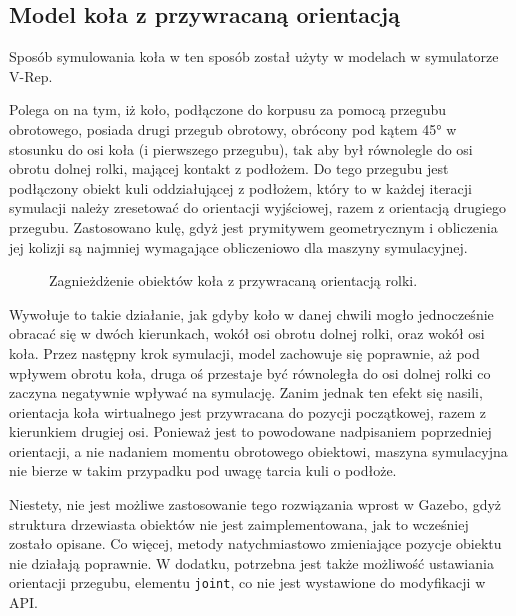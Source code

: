 	\subsection{Model koła z przywracaną orientacją}
		Sposób symulowania koła w ten sposób został użyty w modelach w symulatorze V-Rep.

		Polega on na tym, iż koło, podłączone do korpusu za pomocą przegubu obrotowego, posiada drugi przegub obrotowy, 
		obrócony pod kątem 45° w stosunku do osi koła (i pierwszego przegubu), tak aby był równolegle do osi obrotu dolnej rolki, mającej kontakt z podłożem.
		Do tego przegubu jest podłączony obiekt kuli oddziałującej z podłożem, który to w każdej iteracji symulacji należy zresetować do orientacji wyjściowej, razem z
		orientacją drugiego przegubu.
		Zastosowano kulę, gdyż jest prymitywem geometrycznym i obliczenia jej kolizji są najmniej wymagające obliczeniowo dla maszyny symulacyjnej.

		\begin{figure}[H]
		\caption{Zagnieżdżenie obiektów koła z przywracaną orientacją rolki.}
		\label{fig:vrep_wheel}
		\end{figure}

		Wywołuje to takie działanie, jak gdyby koło w danej chwili mogło jednocześnie obracać się w dwóch kierunkach, wokół osi obrotu dolnej rolki, oraz wokół osi koła.
		Przez następny krok symulacji, model zachowuje się poprawnie, aż pod wpływem obrotu koła, druga oś przestaje być równoległa do osi dolnej rolki
		co zaczyna negatywnie wpływać na symulację.
		Zanim jednak ten efekt się nasili, orientacja koła wirtualnego jest przywracana do pozycji początkowej, razem z kierunkiem drugiej osi.
		Ponieważ jest to powodowane nadpisaniem poprzedniej orientacji, a nie nadaniem momentu obrotowego obiektowi, 
		maszyna symulacyjna nie bierze w takim przypadku pod uwagę tarcia kuli o podłoże. 

		Niestety, nie jest możliwe zastosowanie tego rozwiązania wprost w Gazebo, gdyż struktura drzewiasta obiektów nie jest zaimplementowana, jak to wcześniej zostało opisane.
		Co więcej, metody natychmiastowo zmieniające pozycje obiektu nie działają poprawnie.
		W dodatku, potrzebna jest także możliwość ustawiania orientacji przegubu, elementu \texttt{joint}, co nie jest wystawione do modyfikacji w API.

